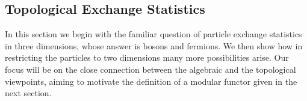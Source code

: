 \documentclass[aps, tightenlines, letterpaper, onecolumn, superscriptaddress, notitlepage, 11pt, groupedaddress]{revtex4-1}
\begin{document}


%
%

\subsection{Topological Exchange Statistics}

In this section we begin with the familiar question 
of particle exchange statistics in three dimensions, whose answer is bosons and fermions.
We then show how in restricting the particles to two dimensions many
more possibilities arise.
Our focus will be on the close connection between the algebraic and the topological viewpoints,
aiming to motivate the definition of a modular functor given in the next section.
\end{document}
